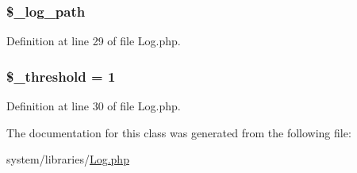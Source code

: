 \hypertarget{class_c_i___log_a3eaf9e92941ee6be33bc972ab76b4caf}{
\subsubsection[{\$\-\_\-log\-\_\-path}]{\setlength{\rightskip}{0pt plus 5cm}\$\-\_\-log\-\_\-path\hspace{0.3cm}{\ttfamily [protected]}}}\label{class_c_i___log_a3eaf9e92941ee6be33bc972ab76b4caf}


Definition at line 29 of file Log.\-php.

\hypertarget{class_c_i___log_a0fc9914bdaf300fa9a1745201204e73f}{
\subsubsection[{\$\-\_\-threshold}]{\setlength{\rightskip}{0pt plus 5cm}\$\-\_\-threshold = 1\hspace{0.3cm}{\ttfamily [protected]}}}\label{class_c_i___log_a0fc9914bdaf300fa9a1745201204e73f}


Definition at line 30 of file Log.\-php.



The documentation for this class was generated from the following file\-:\begin{DoxyCompactItemize}
\item 
system/libraries/\hyperlink{_log_8php}{Log.\-php}\end{DoxyCompactItemize}
